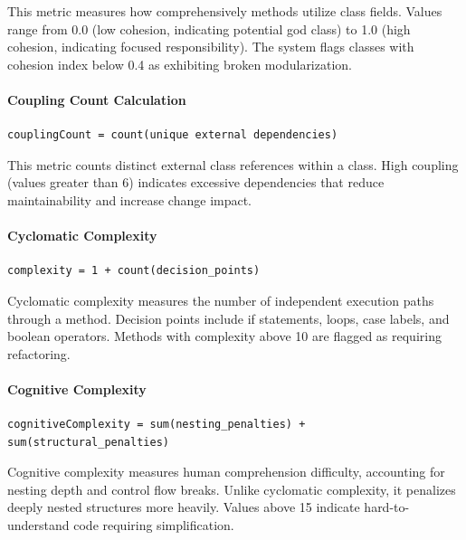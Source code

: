 \documentclass[12pt,a4paper]{article}
\begin{document}
    This metric measures how comprehensively methods utilize class fields. Values range from 0.0 (low cohesion, indicating potential god class) to 1.0 (high cohesion, indicating focused responsibility). The system flags classes with cohesion index below 0.4 as exhibiting broken modularization.

    \paragraph{Coupling Count Calculation}

    \begin{Verbatim}[frame=single, fontsize=\small]
couplingCount = count(unique external dependencies)
    \end{Verbatim}

    This metric counts distinct external class references within a class. High coupling (values greater than 6) indicates excessive dependencies that reduce maintainability and increase change impact.

    \paragraph{Cyclomatic Complexity}

    \begin{Verbatim}[frame=single, fontsize=\small]
complexity = 1 + count(decision_points)
    \end{Verbatim}

    Cyclomatic complexity measures the number of independent execution paths through a method. Decision points include if statements, loops, case labels, and boolean operators. Methods with complexity above 10 are flagged as requiring refactoring.

    \paragraph{Cognitive Complexity}

    \begin{Verbatim}[frame=single, fontsize=\small]
cognitiveComplexity = sum(nesting_penalties) + sum(structural_penalties)
    \end{Verbatim}

    Cognitive complexity measures human comprehension difficulty, accounting for nesting depth and control flow breaks. Unlike cyclomatic complexity, it penalizes deeply nested structures more heavily. Values above 15 indicate hard-to-understand code requiring simplification.
\end{document}
